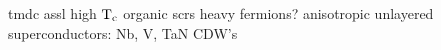 tmdc
assl
high $\rm T_c$
organic scrs
heavy fermions?
anisotropic unlayered superconductors: Nb, V, TaN
CDW's
